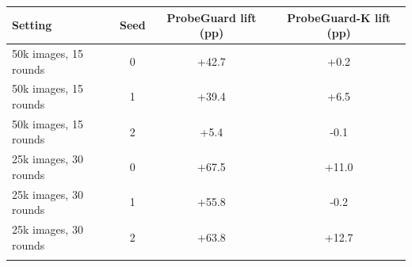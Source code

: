\begin{tabular}{@{}lccc@{}}
\toprule
Setting & Seed & ProbeGuard lift (pp) & ProbeGuard-K lift (pp)\\
\midrule
50k images, 15 rounds & 0 & +42.7 & +0.2\\
50k images, 15 rounds & 1 & +39.4 & +6.5\\
50k images, 15 rounds & 2 & +5.4 & -0.1\\
\addlinespace
25k images, 30 rounds & 0 & +67.5 & +11.0\\
25k images, 30 rounds & 1 & +55.8 & -0.2\\
25k images, 30 rounds & 2 & +63.8 & +12.7\\
\addlinespace
\bottomrule
\end{tabular}